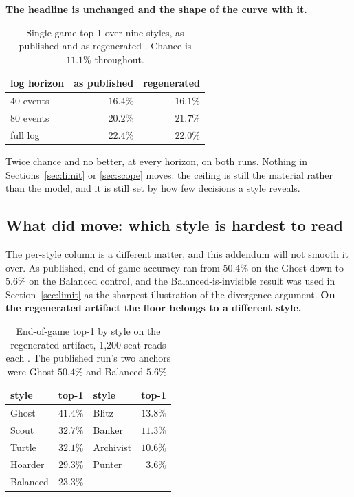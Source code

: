 \documentclass[11pt]{article}
\begin{document}
\textbf{The headline is unchanged and the shape of the curve with it.}

\begin{table}[t]
\centering
\caption{Single-game top-1 over nine styles, as published and as regenerated
\cite{artifact}. Chance is $11.1\%$ throughout.}
\label{tab:addcurve}
\footnotesize
\begin{tabular}{@{}lrr@{}}
\toprule
log horizon & as published & regenerated \\
\midrule
40 events   & $16.4\%$ & $16.1\%$ \\
80 events   & $20.2\%$ & $21.7\%$ \\
full log    & $22.4\%$ & $22.0\%$ \\
\bottomrule
\end{tabular}
\end{table}

Twice chance and no better, at every horizon, on both runs. Nothing in
Sections~\ref{sec:limit} or \ref{sec:scope} moves: the ceiling is still the material rather than
the model, and it is still set by how few decisions a style reveals.

\subsection{What did move: which style is hardest to read}

The per-style column is a different matter, and this addendum will not smooth it over.
As published, end-of-game accuracy ran from $50.4\%$ on the Ghost down to $5.6\%$ on the Balanced
control, and the Balanced-is-invisible result was used in Section~\ref{sec:limit} as the sharpest
illustration of the divergence argument. \textbf{On the regenerated artifact the floor belongs to
a different style.}

\begin{table}[t]
\centering
\caption{End-of-game top-1 by style on the regenerated artifact, 1{,}200 seat-reads each
\cite{artifact}. The published run's two anchors were Ghost $50.4\%$ and Balanced $5.6\%$.}
\label{tab:addbystyle}
\footnotesize
\begin{tabular}{@{}lrlr@{}}
\toprule
style & top-1 & style & top-1 \\
\midrule
Ghost     & $41.4\%$ & Blitz     & $13.8\%$ \\
Scout     & $32.7\%$ & Banker    & $11.3\%$ \\
Turtle    & $32.1\%$ & Archivist & $10.6\%$ \\
Hoarder   & $29.3\%$ & Punter    & $\mathbf{3.6\%}$ \\
Balanced  & $23.3\%$ &           &           \\
\bottomrule
\end{tabular}
\end{table}
\end{document}
